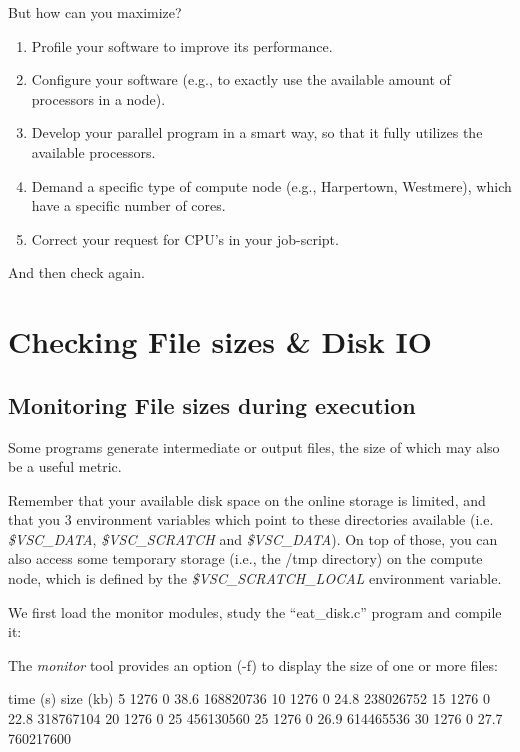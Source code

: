 But how can you maximize?

\begin{enumerate}
\item  Profile your software to improve its performance.
\item  Configure your software (e.g., to exactly use the available amount of processors in a node).
\item  Develop your parallel program in a smart way, so that it fully utilizes the available processors.
\item  Demand a specific type of compute node (e.g., Harpertown, Westmere), which have a specific number of cores.
\item  Correct your request for CPU's in your job-script.
\end{enumerate}

And then check again.

\section{Checking File sizes \& Disk IO}

\subsection{Monitoring File sizes during execution}

Some programs generate intermediate or output files, the size of which may also
be a useful metric.

Remember that your available disk space on the \hpc online storage is limited,
and that you 3 environment variables which point to these directories available
(i.e. \emph{\$VSC\_DATA}, \emph{\$VSC\_SCRATCH} and \emph{\$VSC\_DATA}).
On top of those, you can also access some temporary storage (i.e., the /tmp
directory) on the compute node, which is defined by the
\emph{\$VSC\_SCRATCH\_LOCAL} environment variable.

We first load the monitor modules, study the ``eat\_disk.c'' program and
compile it:

\begin{prompt}
\end{prompt}

The \emph{monitor} tool provides an option (-f) to display the size of one or
more files:

\begin{prompt}
time (s) size (kb) %
5  1276  0 38.6 168820736
10  1276  0 24.8 238026752
15  1276  0 22.8 318767104
20  1276  0 25 456130560
25  1276  0 26.9 614465536
30  1276  0 27.7 760217600
\end{prompt}

